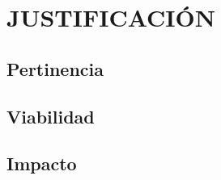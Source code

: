 \section{JUSTIFICACIÓN}
		\subsection{Pertinencia}
		
		\subsection{Viabilidad}
		
		\subsection{Impacto}
